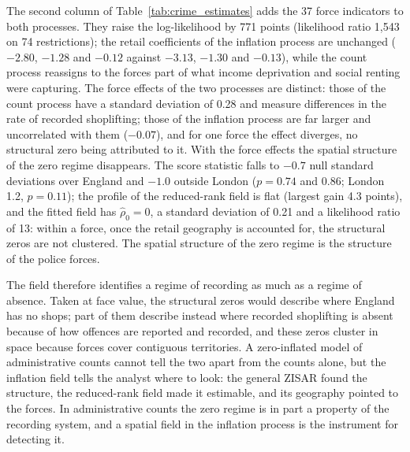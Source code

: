 The second column of Table~\ref{tab:crime_estimates} adds the 37 force indicators to both processes.
They raise the log-likelihood by 771 points (likelihood ratio 1{,}543 on 74 restrictions); the retail coefficients of the inflation process are unchanged ($-2.80$, $-1.28$ and $-0.12$ against $-3.13$, $-1.30$ and $-0.13$), while the count process reassigns to the forces part of what income deprivation and social renting were capturing.
The force effects of the two processes are distinct: those of the count process have a standard deviation of 0.28 and measure differences in the rate of recorded shoplifting; those of the inflation process are far larger and uncorrelated with them ($-0.07$), and for one force the effect diverges, no structural zero being attributed to it.
With the force effects the spatial structure of the zero regime disappears.
The score statistic falls to $-0.7$ null standard deviations over England and $-1.0$ outside London ($p = 0.74$ and $0.86$; London 1.2, $p = 0.11$); the profile of the reduced-rank field is flat (largest gain 4.3 points), and the fitted field has $\hat\rho_0 = 0$, a standard deviation of 0.21 and a likelihood ratio of 13: within a force, once the retail geography is accounted for, the structural zeros are not clustered.
The spatial structure of the zero regime is the structure of the police forces.

The field therefore identifies a regime of recording as much as a regime of absence.
Taken at face value, the structural zeros would describe where England has no shops; part of them describe instead where recorded shoplifting is absent because of how offences are reported and recorded, and these zeros cluster in space because forces cover contiguous territories.
A zero-inflated model of administrative counts cannot tell the two apart from the counts alone, but the inflation field tells the analyst where to look: the general ZISAR found the structure, the reduced-rank field made it estimable, and its geography pointed to the forces.
In administrative counts the zero regime is in part a property of the recording system, and a spatial field in the inflation process is the instrument for detecting it.
